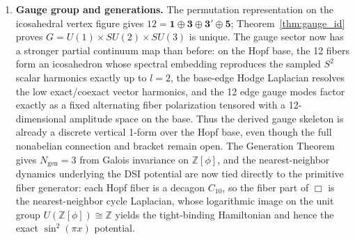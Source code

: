 \documentclass[12pt,a4paper]{article}
\theoremstyle{definition}
\begin{document}
\begin{enumerate}
\item \textbf{Gauge group and generations.}  The permutation representation on the icosahedral vertex figure gives $12 = \mathbf{1} \oplus \mathbf{3} \oplus \mathbf{3'} \oplus \mathbf{5}$; Theorem~\ref{thm:gauge_id} proves $G = U(1) \times SU(2) \times SU(3)$ is unique.  The gauge sector now has a stronger partial continuum map than before: on the Hopf base, the 12 fibers form an icosahedron whose spectral embedding reproduces the sampled $S^2$ scalar harmonics exactly up to $l=2$, the base-edge Hodge Laplacian resolves the low exact/coexact vector harmonics, and the 12 edge gauge modes factor exactly as a fixed alternating fiber polarization tensored with a 12-dimensional amplitude space on the base.  Thus the derived gauge skeleton is already a discrete vertical 1-form over the Hopf base, even though the full nonabelian connection and bracket remain open.  The Generation Theorem gives $N_{\text{gen}} = 3$ from Galois invariance on $\mathbb{Z}[\phi]$, and the nearest-neighbor dynamics underlying the DSI potential are now tied directly to the primitive fiber generator: each Hopf fiber is a decagon $C_{10}$, so the fiber part of $\Box$ is the nearest-neighbor cycle Laplacian, whose logarithmic image on the unit group $U(\mathbb{Z}[\phi]) \cong \mathbb{Z}$ yields the tight-binding Hamiltonian and hence the exact $\sin^2(\pi x)$ potential.


\end{enumerate}
\end{document}
